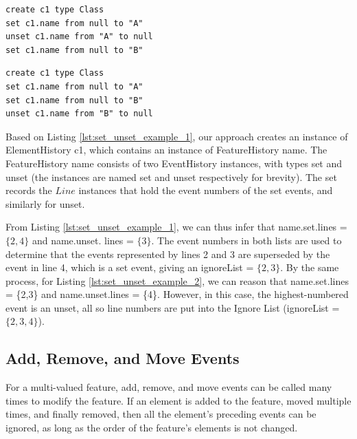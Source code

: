 \vspace{-20pt}
\begin{minipage}[t]{0.49\linewidth}
\begin{lstlisting}[style=eol,caption={A CBP representation of attribute \textsf{name} assignments ended with SET.},label=lst:set_unset_example_1]
create c1 type Class
set c1.name from null to "A"
unset c1.name from "A" to null
set c1.name from null to "B"
\end{lstlisting}
\end{minipage}
\hfill
\begin{minipage}[t]{0.49\linewidth}
\begin{lstlisting}[style=eol,caption={A CBP representation of attribute \textsf{name} assignments ended with UNSET.},label=lst:set_unset_example_2]
create c1 type Class
set c1.name from null to "A"
set c1.name from null to "B"
unset c1.name from "B" to null
\end{lstlisting}
\end{minipage}

Based on Listing \ref{lst:set_unset_example_1}, our approach creates an instance of \textsf{ElementHistory} \textsf{c1}, which contains an instance of \textsf{FeatureHistory} \textsf{name}. The \textsf{FeatureHistory} \textsf{name} consists of two \textsf{EventHistory} instances, with types \textsf{set} and \textsf{unset} (the instances are named \textsf{set} and \textsf{unset} respectively for brevity). The \textsf{set} records the $Line$ instances that hold the event numbers of the \textsf{set} events, and similarly for \textsf{unset}.

From Listing \ref{lst:set_unset_example_1}, we can thus infer that \textsf{name}.\textsf{set}.\textsf{lines} = $\{2,4\}$ and \textsf{name}.\textsf{unset}. \textsf{lines} = $\{3\}$. The event numbers in both lists are used to determine that the events represented by lines 2 and 3 are superseded by the event in line 4, which is a \textsf{set} event, giving an \textsf{ignoreList} = $\{2, 3\}$. By the same process, for Listing \ref{lst:set_unset_example_2}, we can reason that \textsf{name}.\textsf{set}.\textsf{lines} = \{2,3\} and \textsf{name}.\textsf{unset}.\textsf{lines} = \{4\}. However, in this case, the highest-numbered event is an \textsf{unset}, all so line numbers are put into the Ignore List (\textsf{ignoreList} = $\{2, 3, 4\}$).
  
\subsection{Add, Remove, and Move Events}\label{subsec:add_remove_and_move_operations}
For a multi-valued feature, add, remove, and move events can be called many times to modify the feature. If an element is added to the feature, moved multiple times, and finally removed, then all the element’s preceding events can be ignored, as long as the order of the feature’s elements is not changed.

